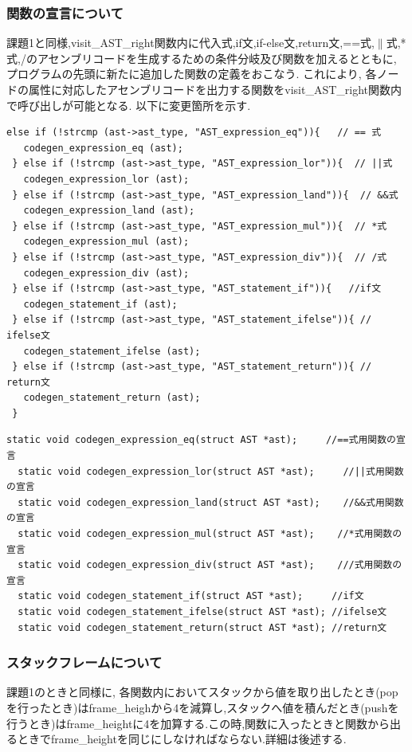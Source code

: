 \documentclass[10pt]{jsarticle}
\begin{document}
\subsubsection{関数の宣言について}
課題1と同様,visit\_AST\_right関数内に代入式,if文,if-else文,return文,==式,$\parallel$式,*式,/のアセンブリコードを生成するための条件分岐及び関数を加えるとともに, プログラムの先頭に新たに追加した関数の定義をおこなう. これにより, 各ノードの属性に対応したアセンブリコードを出力する関数をvisit\_AST\_right関数内で呼び出しが可能となる.
以下に変更箇所を示す.
\begin{lstlisting}[caption=visit\_AST\_right関数]
  else if (!strcmp (ast->ast_type, "AST_expression_eq")){   // == 式
   codegen_expression_eq (ast);
 } else if (!strcmp (ast->ast_type, "AST_expression_lor")){  // ||式
   codegen_expression_lor (ast);
 } else if (!strcmp (ast->ast_type, "AST_expression_land")){  // &&式
   codegen_expression_land (ast);
 } else if (!strcmp (ast->ast_type, "AST_expression_mul")){  // *式
   codegen_expression_mul (ast);
 } else if (!strcmp (ast->ast_type, "AST_expression_div")){  // /式
   codegen_expression_div (ast);
 } else if (!strcmp (ast->ast_type, "AST_statement_if")){   //if文
   codegen_statement_if (ast);
 } else if (!strcmp (ast->ast_type, "AST_statement_ifelse")){ // ifelse文
   codegen_statement_ifelse (ast);
 } else if (!strcmp (ast->ast_type, "AST_statement_return")){ // return文
   codegen_statement_return (ast);
 }
\end{lstlisting}

\begin{lstlisting}[caption=関数の宣言]
  static void codegen_expression_eq(struct AST *ast);     //==式用関数の宣言
  static void codegen_expression_lor(struct AST *ast);     //||式用関数の宣言
  static void codegen_expression_land(struct AST *ast);    //&&式用関数の宣言
  static void codegen_expression_mul(struct AST *ast);    //*式用関数の宣言
  static void codegen_expression_div(struct AST *ast);    ///式用関数の宣言
  static void codegen_statement_if(struct AST *ast);     //if文
  static void codegen_statement_ifelse(struct AST *ast); //ifelse文
  static void codegen_statement_return(struct AST *ast); //return文
\end{lstlisting}

\subsubsection{スタックフレームについて}
課題1のときと同様に, 各関数内においてスタックから値を取り出したとき(pop を行ったとき)はframe\_heighから4を減算し,スタックへ値を積んだとき(pushを行うとき)はframe\_heightに4を加算する.この時,関数に入ったときと関数から出るときでframe\_heightを同じにしなければならない.詳細は後述する.
\end{document}

